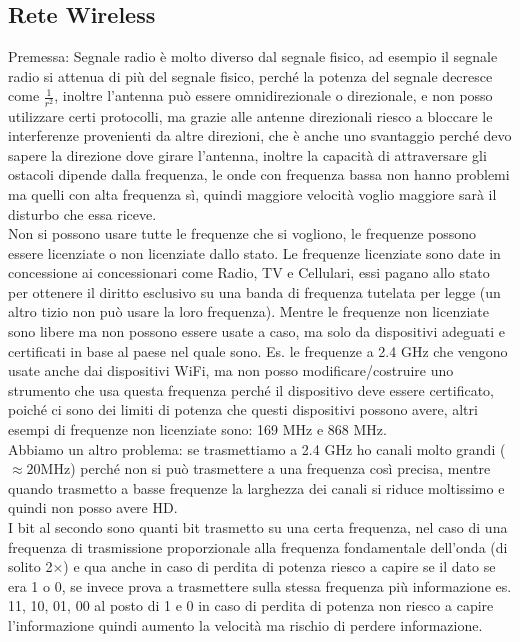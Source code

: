 \documentclass[11pt, twocolumn]{article}
\begin{document}
\subsection{Rete Wireless}
Premessa: Segnale radio è molto diverso dal segnale fisico, ad esempio il segnale radio si attenua di più del segnale fisico, perché la potenza del segnale decresce come $\frac{1}{r^2}$, inoltre l'antenna può essere omnidirezionale o direzionale, e non posso utilizzare certi protocolli, ma grazie alle antenne direzionali riesco a bloccare le interferenze provenienti da altre direzioni, che è anche uno svantaggio perché devo sapere la direzione dove girare l'antenna, inoltre la capacità di attraversare gli ostacoli dipende dalla frequenza, le onde con frequenza bassa non hanno problemi ma quelli con alta frequenza sì, quindi maggiore velocità voglio maggiore sarà il disturbo che essa riceve.\\
Non si possono usare tutte le frequenze che si vogliono, le frequenze possono essere licenziate o non licenziate dallo stato.
Le frequenze licenziate sono date in concessione ai concessionari come Radio, TV e Cellulari, essi pagano allo stato per ottenere il diritto esclusivo su una banda di frequenza tutelata per legge (un altro tizio non può usare la loro frequenza).
Mentre le frequenze non licenziate sono libere ma non possono essere usate a caso, ma solo da dispositivi adeguati e certificati in base al paese nel quale sono.
Es. le frequenze a 2.4 GHz che vengono usate anche dai dispositivi WiFi, ma non posso modificare/costruire uno strumento che usa questa frequenza perché il dispositivo deve essere certificato, poiché ci sono dei limiti di potenza che questi dispositivi possono avere, altri esempi di frequenze non licenziate sono: 169 MHz e 868 MHz.\\
Abbiamo un altro problema: se trasmettiamo a 2.4 GHz ho canali molto grandi ($\approx 20$MHz) perché non si può trasmettere a una frequenza così precisa, mentre quando trasmetto a basse frequenze la larghezza dei canali si riduce moltissimo e quindi non posso avere HD.\\
I bit al secondo sono quanti bit trasmetto su una certa frequenza, nel caso di una frequenza di trasmissione proporzionale alla frequenza fondamentale dell'onda (di solito 2$\times$) e qua anche in caso di perdita di potenza riesco a capire se il dato se era 1 o 0, se invece prova a trasmettere sulla stessa frequenza più informazione es. 11, 10, 01, 00 al posto di 1 e 0 in caso di perdita di potenza non riesco a capire l'informazione quindi aumento la velocità ma rischio di perdere informazione.\\
\end{document}
